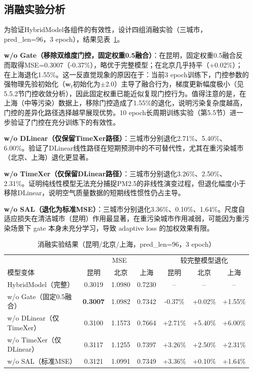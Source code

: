 \documentclass[12pt,a4paper]{article}
\begin{document}
\subsection{消融实验分析}

为验证HybridModel各组件的有效性，设计四组消融实验（三城市，pred\_len=96，3 epoch），结果见表~\ref{tab:ablation}。

\textbf{w/o Gate（移除双维度门控，固定权重0.5融合）}：在昆明，固定权重0.5融合反而取得MSE=0.3007（-0.37\%），略优于完整模型；在北京几乎持平（+0.02\%）；在上海退化1.55\%。这一反直觉现象的原因在于：当前3 epoch训练下，门控参数的强物理先验初始化（$\mathbf{w}_t$初始化为$\pm$2.0）主导了融合行为，梯度更新幅度极小（见5.5.2节门控收敛分析），因此固定权重已能近似复现门控行为。值得注意的是，在上海（中等污染）数据上，移除门控造成了1.55\%的退化，说明污染复杂度越高，门控的差异化路径选择越早展现优势。10 epoch长周期训练实验（第5.5节）进一步验证了门控在充分训练下的有效性。

\textbf{w/o DLinear（仅保留TimeXer路径）}：三城市分别退化2.71\%、5.40\%、6.00\%。验证了DLinear线性路径在短期预测中的不可替代性，尤其在重污染城市（北京、上海）退化更显著。

\textbf{w/o TimeXer（仅保留DLinear路径）}：三城市分别退化3.26\%、2.50\%、2.31\%。证明纯线性模型无法充分捕捉PM2.5的非线性演变过程，但退化幅度小于移除DLinear，说明空气质量数据的短期线性惯性仍占主导。

\textbf{w/o SAL（退化为标准MSE）}：三城市分别退化3.36\%、0.10\%、1.64\%。尺度自适应损失在清洁城市（昆明）作用最显著，在重污染城市作用减弱，可能因为重污染场景下 gate 本身未充分学习，导致 adaptive loss 的加权效果有限。

\begin{table}[H]
\centering
\caption{消融实验结果（昆明/北京/上海，pred\_len=96，3 epoch）}
\label{tab:ablation}
\small
\begin{tabular}{l|ccc|ccc}
\toprule
& \multicolumn{3}{c|}{MSE} & \multicolumn{3}{c}{较完整模型退化} \\
模型变体 & 昆明 & 北京 & 上海 & 昆明 & 北京 & 上海 \\
\midrule
HybridModel（完整） & 0.3019 & 1.0980 & 0.7230 & -- & -- & -- \\
w/o Gate（固定0.5融合） & \textbf{0.3007} & 1.0982 & 0.7342 & -0.37\% & +0.02\% & +1.55\% \\
w/o DLinear（仅TimeXer） & 0.3100 & 1.1573 & 0.7664 & +2.71\% & +5.40\% & +6.00\% \\
w/o TimeXer（仅DLinear） & 0.3117 & 1.1255 & 0.7397 & +3.26\% & +2.50\% & +2.31\% \\
w/o SAL（标准MSE） & 0.3121 & 1.0991 & 0.7349 & +3.36\% & +0.10\% & +1.64\% \\
\bottomrule
\end{tabular}
\end{table}
\end{document}
